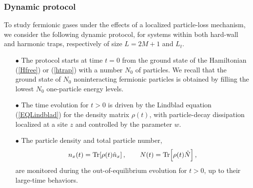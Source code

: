   
  \subsubsection{Dynamic protocol}
  \label{dynprot}
  
  To study fermionic gases under the effects of a localized
  particle-loss mechanism, we consider the following dynamic protocol,
  for systems within both hard-wall and harmonic traps, respectively of
  size $L=2M+1$ and $L_t$.
  
  \begin{itemize}
  
  \item[$\bullet$] The protocol starts at time $t=0$ from the ground
    state of the Hamiltonian (\ref{Hfree}) or (\ref{htrap}) with a
    number $N_0$ of particles. We recall that the ground state of $N_0$
    noninteracting fermionic particles is obtained by filling the lowest
    $N_0$ one-particle energy levels.
  
  \item[$\bullet$] The time evolution for $t>0$ is driven by the 
    Lindblad equation (\ref{EQLindblad}) for the density matrix
    $\rho(t)$, with particle-decay dissipation localized at a site $z$
    and controlled by the parameter $w$.
  
  \item[$\bullet$]
  The particle density and total particle number,  
  \begin{eqnarray}
  n_x(t) = {\rm Tr}[ \rho(t) \hat n_x ] \,,\qquad
  N(t) = {\rm Tr}\Bigr[ \rho(t) \hat N \Bigr] \,,
  \label{nxntdef}
  \end{eqnarray}
  are monitored during the out-of-equilibrium evolution for $t>0$, up to
  their large-time behaviors.
  
  \end{itemize}
  
